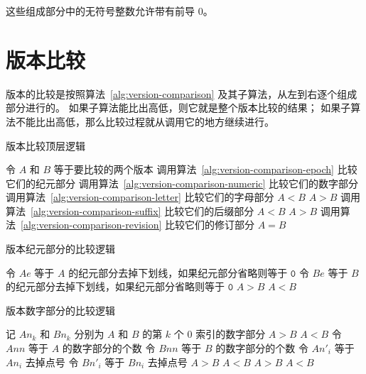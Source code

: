 这些组成部分中的无符号整数允许带有前导 0。

\section{版本比较}

版本的比较是按照算法~\ref{alg:version-comparison} 及其子算法，从左到右逐个组成部分进行的。
如果子算法能比出高低，则它就是整个版本比较的结果；
如果子算法不能比出高低，那么比较过程就从调用它的地方继续进行。

\begin{algorithm}[h]
\caption{版本比较顶层逻辑} \label{alg:version-comparison}
\begin{algorithmic}[1]
    \STATE 令 $A$ 和 $B$ 等于要比较的两个版本
    \STATE 调用算法~\ref{alg:version-comparison-epoch} 比较它们的纪元部分
    \STATE 调用算法~\ref{alg:version-comparison-numeric} 比较它们的数字部分
        \STATE 调用算法~\ref{alg:version-comparison-letter} 比较它们的字母部分
        \RETURN $A<B$
        \RETURN $A>B$
    \ENDIF
        \STATE 调用算法~\ref{alg:version-comparison-suffix} 比较它们的后缀部分
        \RETURN $A<B$
        \RETURN $A>B$
    \ENDIF
    \STATE 调用算法~\ref{alg:version-comparison-revision} 比较它们的修订部分
    \RETURN $A=B$
\end{algorithmic}
\end{algorithm}

\begin{algorithm}[h]
\caption{版本纪元部分的比较逻辑} \label{alg:version-comparison-epoch}
\begin{algorithmic}[1]
    \STATE 令 $Ae$ 等于 $A$ 的纪元部分去掉下划线，如果纪元部分省略则等于 $\texttt{0}$
    \STATE 令 $Be$ 等于 $B$ 的纪元部分去掉下划线，如果纪元部分省略则等于 $\texttt{0}$
        \RETURN $A>B$
        \RETURN $A<B$
    \ENDIF
\end{algorithmic}
\end{algorithm}

\begin{algorithm}[p]
\caption{版本数字部分的比较逻辑} \label{alg:version-comparison-numeric}
\begin{algorithmic}[1]
    \STATE 记 $An_k$ 和 $Bn_k$ 分别为 $A$ 和 $B$ 的第 $k$ 个 $0$ 索引的数字部分
        \RETURN $A>B$
        \RETURN $A<B$
    \ENDIF
    \STATE 令 $Ann$ 等于 $A$ 的数字部分的个数
    \STATE 令 $Bnn$ 等于 $B$ 的数字部分的个数
        \STATE 令 $An'_i$ 等于 $An_i$ 去掉点号
        \STATE 令 $Bn'_i$ 等于 $Bn_i$ 去掉点号
            \RETURN $A>B$
            \RETURN $A<B$
        \ENDIF
    \ENDFOR
        \RETURN $A>B$
        \RETURN $A<B$
    \ENDIF
\end{algorithmic}
\end{algorithm}

